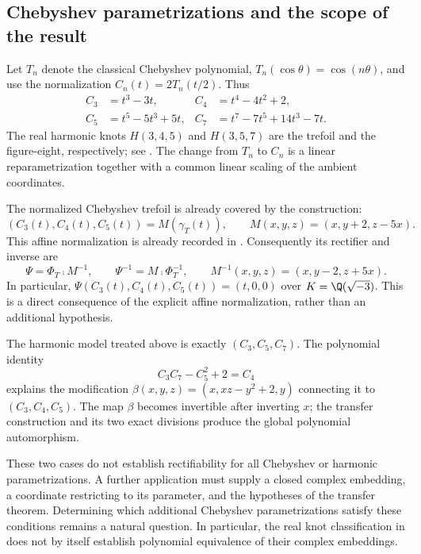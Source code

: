 \subsection{Chebyshev parametrizations and the scope of the result}

Let $T_n$ denote the classical Chebyshev polynomial,
$T_n(\cos\theta)=\cos(n\theta)$, and use the normalization
$C_n(t)=2T_n(t/2)$. Thus
\[
\begin{aligned}
C_3&=t^3-3t, & C_4&=t^4-4t^2+2,\\
C_5&=t^5-5t^3+5t, & C_7&=t^7-7t^5+14t^3-7t.
\end{aligned}
\]
The real harmonic knots $H(3,4,5)$ and $H(3,5,7)$ are the trefoil and
the figure-eight, respectively; see \cite[Introduction and
Definition~1.2]{KP}. The change from $T_n$ to $C_n$ is a linear
reparametrization together with a common linear scaling of the ambient
coordinates.

The normalized Chebyshev trefoil is already covered by the construction:
\[
(C_3(t),C_4(t),C_5(t))=M(\gamma_T(t)),\qquad
M(x,y,z)=(x,y+2,z-5x).
\]
This affine normalization is already recorded in
\cite[Introduction, p.~3]{FF}.
Consequently its rectifier and inverse are
\[
\Psi=\Phi_T\comp M^{-1},\qquad
\Psi^{-1}=M\comp\Phi_T^{-1},\qquad
M^{-1}(x,y,z)=(x,y-2,z+5x).
\]
In particular, $\Psi(C_3(t),C_4(t),C_5(t))=(t,0,0)$ over
$K=\Q(\sqrt{-3})$. This is a direct consequence of the explicit affine
normalization, rather than an additional hypothesis.

The harmonic model treated above is exactly $(C_3,C_5,C_7)$. The
polynomial identity
\[
C_3C_7-C_5^2+2=C_4
\]
explains the modification
$\beta(x,y,z)=(x,xz-y^2+2,y)$ connecting it to $(C_3,C_4,C_5)$.
The map $\beta$ becomes invertible after inverting $x$; the transfer
construction and its two exact divisions produce the global polynomial
automorphism.

These two cases do not establish rectifiability for all Chebyshev or
harmonic parametrizations. A further application must supply a closed
complex embedding, a coordinate restricting to its parameter, and the
hypotheses of the transfer theorem. Determining which additional
Chebyshev parametrizations satisfy these conditions remains a natural
question. In particular, the real knot classification in \cite{KP}
does not by itself establish polynomial equivalence of their complex
embeddings.
